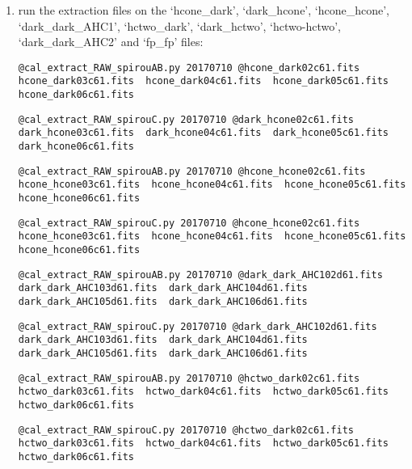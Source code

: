\begin{enumerate}
\item run the extraction files on the `hcone\_dark', `dark\_hcone', `hcone\_hcone', `dark\_dark\_AHC1', `hctwo\_dark', `dark\_hctwo', `hctwo-hctwo', `dark\_dark\_AHC2' and `fp\_fp'  files:
\begin{lstlisting}[style=bashstyle]
@cal_extract_RAW_spirouAB.py 20170710 @hcone_dark02c61.fits  hcone_dark03c61.fits  hcone_dark04c61.fits  hcone_dark05c61.fits  hcone_dark06c61.fits
\end{lstlisting}  
\begin{lstlisting}[style=bashstyle]
@cal_extract_RAW_spirouC.py 20170710 @dark_hcone02c61.fits  dark_hcone03c61.fits  dark_hcone04c61.fits  dark_hcone05c61.fits  dark_hcone06c61.fits
\end{lstlisting}  
\begin{lstlisting}[style=bashstyle]
@cal_extract_RAW_spirouAB.py 20170710 @hcone_hcone02c61.fits  hcone_hcone03c61.fits  hcone_hcone04c61.fits  hcone_hcone05c61.fits  hcone_hcone06c61.fits
\end{lstlisting}  
\begin{lstlisting}[style=bashstyle]
@cal_extract_RAW_spirouC.py 20170710 @hcone_hcone02c61.fits  hcone_hcone03c61.fits  hcone_hcone04c61.fits  hcone_hcone05c61.fits  hcone_hcone06c61.fits
\end{lstlisting}  
\begin{lstlisting}[style=bashstyle]
@cal_extract_RAW_spirouAB.py 20170710 @dark_dark_AHC102d61.fits  dark_dark_AHC103d61.fits  dark_dark_AHC104d61.fits  dark_dark_AHC105d61.fits  dark_dark_AHC106d61.fits
\end{lstlisting}  
\begin{lstlisting}[style=bashstyle]
@cal_extract_RAW_spirouC.py 20170710 @dark_dark_AHC102d61.fits  dark_dark_AHC103d61.fits  dark_dark_AHC104d61.fits  dark_dark_AHC105d61.fits  dark_dark_AHC106d61.fits
\end{lstlisting}  
\begin{lstlisting}[style=bashstyle]
@cal_extract_RAW_spirouAB.py 20170710 @hctwo_dark02c61.fits  hctwo_dark03c61.fits  hctwo_dark04c61.fits  hctwo_dark05c61.fits  hctwo_dark06c61.fits
\end{lstlisting}  
\begin{lstlisting}[style=bashstyle]
@cal_extract_RAW_spirouC.py 20170710 @hctwo_dark02c61.fits  hctwo_dark03c61.fits  hctwo_dark04c61.fits  hctwo_dark05c61.fits  hctwo_dark06c61.fits
\end{lstlisting}  
\begin{lstlisting}[style=bashstyle]

\end{lstlisting}
\end{enumerate}
